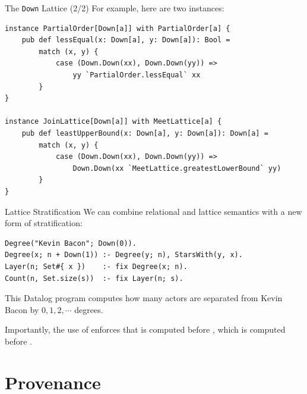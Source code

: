 \begin{frame}[fragile]{The \texttt{Down} Lattice (2/2)}
For example, here are two instances:

\begin{lstlisting}[language=flix, xleftmargin=0.5cm]
instance PartialOrder[Down[a]] with PartialOrder[a] {
    pub def lessEqual(x: Down[a], y: Down[a]): Bool = 
        match (x, y) {
            case (Down.Down(xx), Down.Down(yy)) => 
                yy `PartialOrder.lessEqual` xx
        }
}

instance JoinLattice[Down[a]] with MeetLattice[a] {
    pub def leastUpperBound(x: Down[a], y: Down[a]): Down[a] = 
        match (x, y) {
            case (Down.Down(xx), Down.Down(yy)) => 
                Down.Down(xx `MeetLattice.greatestLowerBound` yy)
        }
}
\end{lstlisting}
\end{frame}

\begin{frame}[fragile]{Lattice Stratification}
We can combine relational and lattice semantics with a new form of
stratification: 

\begin{lstlisting}[language=flix, xleftmargin=0.8cm]
Degree("Kevin Bacon"; Down(0)).
Degree(x; n + Down(1)) :- Degree(y; n), StarsWith(y, x).
Layer(n; Set#{ x })    :- fix Degree(x; n).
Count(n, Set.size(s))  :- fix Layer(n; s).
\end{lstlisting}

\pause

This Datalog program computes how many actors are separated from Kevin Bacon by
$0, 1, 2, \cdots$ degrees.

\pause

Importantly, the use of  enforces that  is computed
before , which is computed before .
\end{frame}

\section{Provenance}

